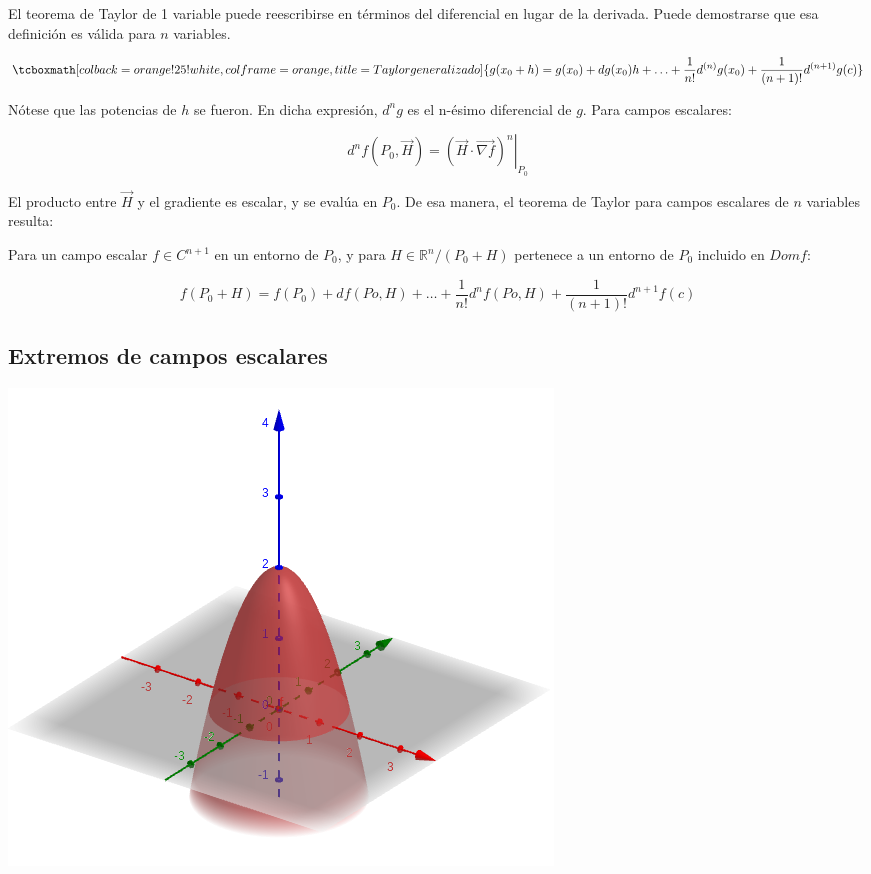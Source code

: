 \documentclass{article}
\renewcommand{\Bbb}{\mathbb}
\begin{document}
El teorema de Taylor de 1 variable puede reescribirse en términos del diferencial en lugar de la derivada. Puede demostrarse que esa definición es válida para $n$ variables.

\begin{equation}
\tcboxmath[colback=orange!25!white,colframe=orange, title=Taylor generalizado]
{ g(x_0 + h) = g(x_0) + dg(x_0) h + \ldots + \frac{1}{n!} d^{(n)}g(x_0) +  \frac{1}{(n+1)!} d^{(n+1)}g(c) }
\end{equation}

Nótese que las potencias de $h$ se fueron. En dicha expresión, $d^ng$ es el n-ésimo diferencial de $g$. Para campos escalares:

\begin{equation}
d^{n}f(P_0, \overrightarrow{H}) = \left. (\overrightarrow{H} \cdot \overrightarrow{\nabla f})^n \right|_{P_0}
\end{equation}

El producto entre $\overrightarrow{H}$ y el gradiente es escalar, y se evalúa en $P_0$. De esa manera, el teorema de Taylor para campos escalares de $n$ variables resulta:

Para un campo escalar $f \in C^{n+1}$ en un entorno de $P_0$, y para $H \in \Bbb R^n/ (P_0+ H)$ pertenece a un entorno de $P_0$ incluido en $Dom f$:

\begin{equation}
f(P_0+H) = f(P_0) + df(Po, H) + \ldots + \frac{1}{n!} d^nf(Po,H) + \frac{1}{(n+1)!} d^{n+1}f(c)
\end{equation}

\subsection{Extremos de campos escalares}

\noindent
\begin{minipage}{\textwidth}
\centering
\captionsetup{type=figure}
\includegraphics[scale=0.6]{img/extremos/tipo1.png} 
\label{fig:exce01}
\end{minipage}
\end{document}
